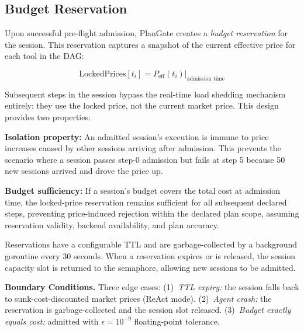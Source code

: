 \documentclass[sigconf,review,anonymous]{acmart}
\begin{document}
\subsection{Budget Reservation}
\label{sec:budget}

Upon successful pre-flight admission, PlanGate creates a \emph{budget reservation} for the session. This reservation captures a snapshot of the current effective price for each tool in the DAG:

\begin{equation}
\text{LockedPrices}[t_i] = P_{\text{eff}}(t_i) \big|_{\text{admission time}}
\end{equation}

Subsequent steps in the session bypass the real-time load shedding mechanism entirely: they use the locked price, not the current market price. This design provides two properties:


\noindent\textbf{Isolation property:} An admitted session's execution is immune to price increases caused by other sessions arriving after admission. This prevents the scenario where a session passes step-0 admission but fails at step 5 because 50 new sessions arrived and drove the price up.

\noindent\textbf{Budget sufficiency:} If a session's budget covers the total cost at admission time, the locked-price reservation remains sufficient for all subsequent declared steps, preventing price-induced rejection within the declared plan scope, assuming reservation validity, backend availability, and plan accuracy.


Reservations have a configurable TTL and are garbage-collected by a background goroutine every 30 seconds. When a reservation expires or is released, the session capacity slot is returned to the semaphore, allowing new sessions to be admitted.

\textbf{Boundary Conditions.}
Three edge cases: (1)~\emph{TTL expiry:} the session falls back to sunk-cost-discounted market prices (ReAct mode). (2)~\emph{Agent crash:} the reservation is garbage-collected and the session slot released. (3)~\emph{Budget exactly equals cost:} admitted with $\epsilon{=}10^{-9}$ floating-point tolerance.
\end{document}
